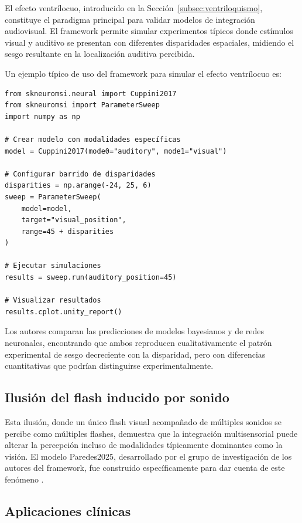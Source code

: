 El efecto ventrílocuo, introducido en la Sección~\ref{subsec:ventriloquismo}, constituye el paradigma principal para validar modelos de integración audiovisual. El framework permite simular experimentos típicos donde estímulos visual y auditivo se presentan con diferentes disparidades espaciales, midiendo el sesgo resultante en la localización auditiva percibida.

Un ejemplo típico de uso del framework para simular el efecto ventrílocuo es:

\begin{verbatim}
from skneuromsi.neural import Cuppini2017
from skneuromsi import ParameterSweep
import numpy as np

# Crear modelo con modalidades específicas
model = Cuppini2017(mode0="auditory", mode1="visual")

# Configurar barrido de disparidades
disparities = np.arange(-24, 25, 6)
sweep = ParameterSweep(
    model=model,
    target="visual_position",
    range=45 + disparities
)

# Ejecutar simulaciones
results = sweep.run(auditory_position=45)

# Visualizar resultados
results.cplot.unity_report()
\end{verbatim}

Los autores comparan las predicciones de modelos bayesianos y de redes neuronales, encontrando que ambos reproducen cualitativamente el patrón experimental de sesgo decreciente con la disparidad, pero con diferencias cuantitativas que podrían distinguirse experimentalmente.

\subsection{Ilusión del flash inducido por sonido}
\label{subsec:snmsi_flash}

Esta ilusión, donde un único flash visual acompañado de múltiples sonidos se percibe como múltiples flashes, demuestra que la integración multisensorial puede alterar la percepción incluso de modalidades típicamente dominantes como la visión. El modelo Paredes2025, desarrollado por el grupo de investigación de los autores del framework, fue construido específicamente para dar cuenta de este fenómeno \citep{paredes2025scikit}.


\subsection{Aplicaciones clínicas}
\label{subsec:snmsi_clinicas}

